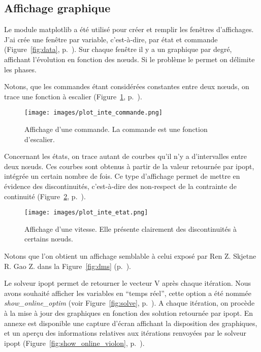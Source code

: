             
            \subsection{Affichage graphique}
                
Le module \gls{matplotlib} a été utilisé pour créer et remplir les fenêtres d'affichages. J'ai crée une fenêtre par variable, c'est-à-dire, par état et commande (Figure~\ref{fig:data}, p.~\pageref{fig:data}). Sur chaque fenêtre il y a un graphique par degré, affichant l'évolution en fonction des nœuds. Si le problème le permet on délimite les phases.

Notons, que les commandes étant considérées constantes entre deux nœuds, on trace une fonction à escalier (Figure~\ref{fig:commande_plot}, p.~\pageref{fig:commande_plot}).
\begin{figure}[h]
\begin{center}
\texttt{[image: images/plot\_inte\_commande.png]}
\caption{Affichage d'une commande. La commande est une fonction d'escalier.}
\label{fig:commande_plot}
\end{center}
\end{figure}

Concernant les états, on trace autant de courbes qu'il n'y a d'intervalles entre deux nœuds. Ces courbes sont obtenus à partir de la valeur retournée par \gls{ipopt}, intégrée un certain nombre de fois. Ce type d'affichage permet de mettre en évidence des discontinuités, c'est-à-dire des non-respect de la contrainte de continuité (Figure~\ref{fig:etat_plot}, p.~\pageref{fig:etat_plot}).


\begin{figure}[h]
\begin{center}
\texttt{[image: images/plot\_inte\_etat.png]}
\caption{Affichage d'une vitesse. Elle présente clairement des discontinuités à certains nœuds.}
\label{fig:etat_plot}
\end{center}
\end{figure}


Notons que l'on obtient un affichage semblable à celui exposé par Ren Z. Skjetne R. Gao Z. \cite{dms} dans la Figure~\ref{fig:dms} (p.~\pageref{fig:dms}).

\label{live}
Le solveur \gls{ipopt} permet de retourner le vecteur V après chaque itération. Nous avons souhaité afficher les variables en ``temps réel'', cette option a été nommée \emph{show\_online\_optim} (voir Figure~\ref{fig:solve}, p.~\pageref{fig:solve}). A chaque itération, on procède à la mise à jour des graphiques en fonction des solution retournée par \gls{ipopt}. En annexe est disponible une capture d'écran affichant la disposition des graphiques, et un aperçu des informations relatives aux itérations renvoyées par le solveur \gls{ipopt} (Figure~\ref{fig:show_online_violon}, p.~\pageref{fig:show_online_violon}).

